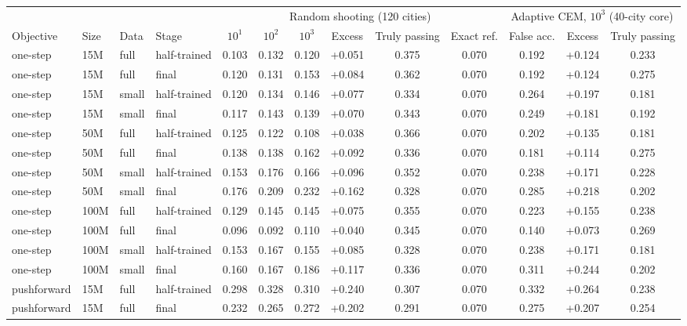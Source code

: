 \setlength{\tabcolsep}{2pt}
\begin{tabular*}{\textwidth}{@{\extracolsep{\fill}}llllccccccccc@{}}
\toprule
 & & & & \multicolumn{6}{c}{Random shooting (120 cities)} & \multicolumn{3}{c}{Adaptive CEM, $10^{3}$ (40-city core)} \\
\cmidrule(lr){5-10}\cmidrule(l){11-13}
Objective & Size & Data & Stage & $10^{1}$ & $10^{2}$ & $10^{3}$ & Excess & Truly passing & Exact ref. & False acc. & Excess & Truly passing \\
\midrule
one-step & 15M & full & half-trained & 0.103 & 0.132 & 0.120 & +0.051 & 0.375 & 0.070 & 0.192 & +0.124 & 0.233 \\
one-step & 15M & full & final & 0.120 & 0.131 & 0.153 & +0.084 & 0.362 & 0.070 & 0.192 & +0.124 & 0.275 \\
one-step & 15M & small & half-trained & 0.120 & 0.134 & 0.146 & +0.077 & 0.334 & 0.070 & 0.264 & +0.197 & 0.181 \\
one-step & 15M & small & final & 0.117 & 0.143 & 0.139 & +0.070 & 0.343 & 0.070 & 0.249 & +0.181 & 0.192 \\
one-step & 50M & full & half-trained & 0.125 & 0.122 & 0.108 & +0.038 & 0.366 & 0.070 & 0.202 & +0.135 & 0.181 \\
one-step & 50M & full & final & 0.138 & 0.138 & 0.162 & +0.092 & 0.336 & 0.070 & 0.181 & +0.114 & 0.275 \\
one-step & 50M & small & half-trained & 0.153 & 0.176 & 0.166 & +0.096 & 0.352 & 0.070 & 0.238 & +0.171 & 0.228 \\
one-step & 50M & small & final & 0.176 & 0.209 & 0.232 & +0.162 & 0.328 & 0.070 & 0.285 & +0.218 & 0.202 \\
one-step & 100M & full & half-trained & 0.129 & 0.145 & 0.145 & +0.075 & 0.355 & 0.070 & 0.223 & +0.155 & 0.238 \\
one-step & 100M & full & final & 0.096 & 0.092 & 0.110 & +0.040 & 0.345 & 0.070 & 0.140 & +0.073 & 0.269 \\
one-step & 100M & small & half-trained & 0.153 & 0.167 & 0.155 & +0.085 & 0.328 & 0.070 & 0.238 & +0.171 & 0.181 \\
one-step & 100M & small & final & 0.160 & 0.167 & 0.186 & +0.117 & 0.336 & 0.070 & 0.311 & +0.244 & 0.202 \\
pushforward & 15M & full & half-trained & 0.298 & 0.328 & 0.310 & +0.240 & 0.307 & 0.070 & 0.332 & +0.264 & 0.238 \\
pushforward & 15M & full & final & 0.232 & 0.265 & 0.272 & +0.202 & 0.291 & 0.070 & 0.275 & +0.207 & 0.254 \\

\end{tabular*}
